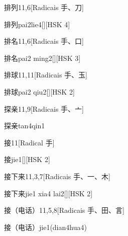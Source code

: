 \begin{entry}{排列}{11,6}[Radicais ⼿、⼑]
  \begin{phonetics}{排列}{pai2lie4}[][HSK 4]
  \end{phonetics}
\end{entry}

\begin{entry}{排名}{11,6}[Radicais ⼿、⼝]
  \begin{phonetics}{排名}{pai2 ming2}[][HSK 3]
  \end{phonetics}
\end{entry}

\begin{entry}{排球}{11,11}[Radicais ⼿、⽟]
  \begin{phonetics}{排球}{pai2 qiu2}[][HSK 2]
  \end{phonetics}
\end{entry}

\begin{entry}{探亲}{11,9}[Radicais ⼿、⼇]
  \begin{phonetics}{探亲}{tan4qin1}
  \end{phonetics}
\end{entry}

\begin{entry}{接}{11}[Radical ⼿]
  \begin{phonetics}{接}{jie1}[][HSK 2]
  \end{phonetics}
\end{entry}

\begin{entry}{接下来}{11,3,7}[Radicais ⼿、⼀、⽊]
  \begin{phonetics}{接下来}{jie1 xia4 lai2}[][HSK 2]
  \end{phonetics}
\end{entry}

\begin{entry}{接（电话）}{11,5,8}[Radicais ⼿、⽥、⾔]
  \begin{phonetics}{接（电话）}{jie1(dian4hua4)}
  \end{phonetics}
\end{entry}

